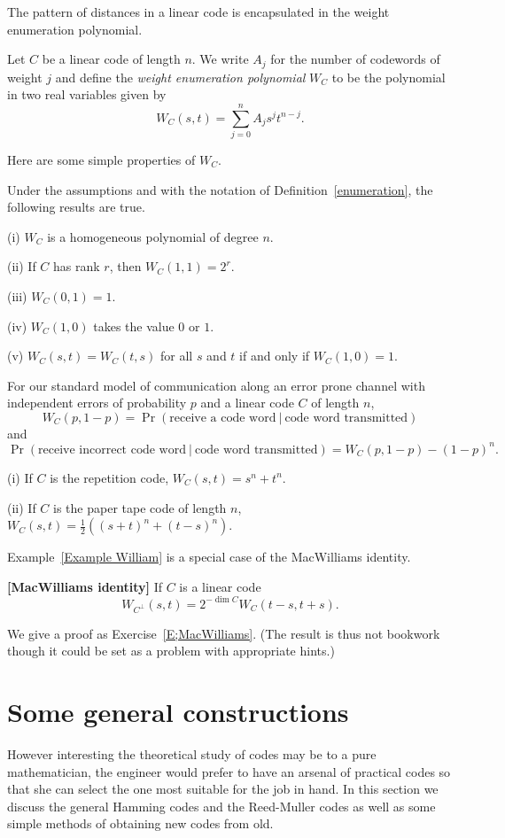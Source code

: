 The pattern of distances in a linear code
is encapsulated in the
weight enumeration polynomial.
\begin{definition}\label{enumeration}
Let $C$ be a linear code of length $n$.
We write $A_{j}$ for the number of codewords
of weight $j$ and define the
\emph{weight enumeration polynomial} $W_{C}$
to be the polynomial in two real variables
given by
\[W_{C}(s,t)=\sum_{j=0}^{n}A_{j}s^{j}t^{n-j}.\]
\end{definition}
Here are some simple properties of $W_{C}$.
\begin{lemma} Under the assumptions and
with the notation of Definition~\ref{enumeration},
the following results are true.

(i) $W_{C}$ is a homogeneous polynomial of degree $n$.

(ii)  If $C$ has rank $r$, then $W_{C}(1,1)=2^{r}$.

(iii) $W_{C}(0,1)=1$.

(iv) $W_{C}(1,0)$ takes the value $0$ or $1$.

(v)  $W_{C}(s,t)=W_{C}(t,s)$ for all $s$ and $t$
if and only if $W_{C}(1,0)=1$.
\end{lemma}
\begin{lemma} For our standard model of communication
along an error prone channel with independent errors
of probability $p$ and a linear code $C$ of length $n$,
\[W_{C}(p,1-p)=\Pr(\text{receive a code word}\ |
\ \text{code word transmitted})\]
and
\[\Pr(\text{receive incorrect code word}\ |
\ \text{code word transmitted})=W_{C}(p,1-p)-(1-p)^{n}.\]
\end{lemma}
\begin{example}\label{Example William}
(i) If $C$ is the repetition code,
$W_{C}(s,t)=s^{n}+t^{n}$.

(ii) If $C$ is the paper tape code of length $n$,
$W_{C}(s,t)=\frac{1}{2}((s+t)^{n}+(t-s)^{n})$.
\end{example}

Example~\ref{Example William} is a special case of the
MacWilliams identity.
\begin{theorem}{\bf [MacWilliams identity]} If $C$ is a linear
code
\[W_{C^{\perp}}(s,t)=2^{-\dim C}W_{C}(t-s,t+s).\]
\end{theorem}
\noindent
We give a proof as Exercise~\ref{E;MacWilliams}.
(The result is thus not bookwork though it
could be set as a problem with appropriate hints.)
\section{Some general constructions} However
interesting the theoretical study of codes may be
to a pure mathematician,
the engineer would prefer to have an arsenal
of practical codes so that she can select
the one most suitable for the job in hand.
In this section we discuss the general Hamming
codes and the Reed-Muller codes as well as some
simple methods of obtaining new codes from
old.

